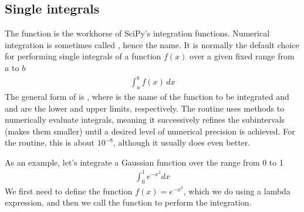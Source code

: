 \documentclass[letterpaper,10pt,english]{sphinxmanual}
\begin{document}
\subsection{Single integrals}
\label{\detokenize{chap9/chap9_scipy:single-integrals}}
\sphinxAtStartPar
The function  is the workhorse of SciPy’s integration functions. Numerical integration is sometimes called , hence the name.  It is normally the default choice for performing single integrals of a function \(f(x)\) over a given fixed range from \(a\) to \(b\)
\begin{equation*}
\begin{split}\int_a^b f(x)\, dx\end{split}
\end{equation*}
\sphinxAtStartPar
The general form of  is , where  is the name of the function to be integrated and  and  are the lower and upper limits, respectively.  The routine uses  methods to numerically evaluate integrals, meaning it successively refines the subintervals (makes them smaller) until a desired level of numerical precision is achieved.  For the  routine, this is about \(10^{-8}\), although it usually does even better.

\sphinxAtStartPar
As an example, let’s integrate a Gaussian function over the range from 0 to 1
\begin{equation*}
\begin{split}\int_0^1 e^{-x^2} dx\end{split}
\end{equation*}
\sphinxAtStartPar
We first need to define the function \(f(x)=e^{-x^2}\), which we do using a lambda expression, and then we call the function  to perform the integration.

\begin{sphinxVerbatim}[commandchars=\\\{\},numbers=left,firstnumber=1,stepnumber=1]
 

     

  
 
\end{sphinxVerbatim}
\end{document}
